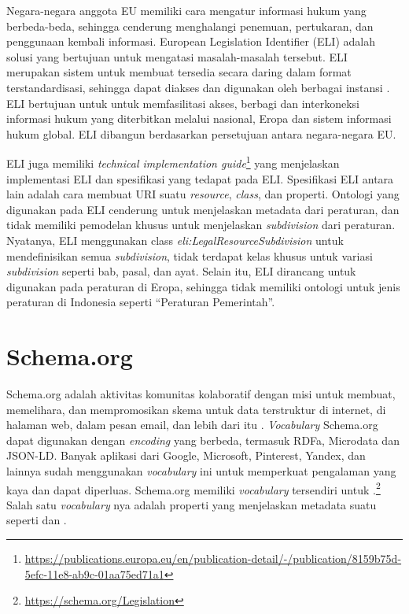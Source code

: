 Negara-negara anggota EU memiliki cara mengatur informasi hukum yang berbeda-beda, sehingga
cenderung menghalangi penemuan, pertukaran, dan penggunaan kembali informasi. European Legislation
Identifier (ELI) adalah solusi yang bertujuan untuk mengatasi masalah-masalah tersebut. ELI
merupakan sistem untuk membuat \legal tersedia secara daring dalam format terstandardisasi, sehingga
dapat diakses dan digunakan oleh berbagai instansi \citep{eli}. ELI bertujuan untuk untuk
memfasilitasi akses, berbagi dan interkoneksi informasi hukum yang diterbitkan melalui nasional,
Eropa dan sistem informasi hukum global. ELI dibangun berdasarkan persetujuan antara negara-negara
EU.

ELI juga memiliki \textit{technical implementation
  guide}\footnote{\url{https://publications.europa.eu/en/publication-detail/-/publication/8159b75d-5efc-11e8-ab9c-01aa75ed71a1}}
yang menjelaskan implementasi ELI dan spesifikasi yang tedapat pada ELI. Spesifikasi ELI antara lain
adalah cara membuat URI suatu \textit{resource}, \textit{class}, dan properti. Ontologi yang
digunakan pada ELI cenderung untuk menjelaskan metadata dari peraturan, dan tidak memiliki pemodelan
khusus untuk menjelaskan \textit{subdivision} dari peraturan. Nyatanya, ELI menggunakan class
\textit{eli:LegalResourceSubdivision} untuk mendefinisikan semua \textit{subdivision}, tidak
terdapat kelas khusus untuk variasi \textit{subdivision} seperti bab, pasal, dan ayat. Selain itu,
ELI dirancang untuk digunakan pada peraturan di Eropa, sehingga tidak memiliki ontologi untuk jenis
peraturan di Indonesia seperti ``Peraturan Pemerintah''.

\section{Schema.org}
\label{sec:schema-org}

Schema.org adalah aktivitas komunitas kolaboratif dengan misi untuk membuat, memelihara, dan
mempromosikan skema untuk data terstruktur di internet, di halaman web, dalam pesan email, dan lebih
dari itu \citep{schema.org}. \textit{Vocabulary} Schema.org dapat digunakan dengan \textit{encoding}
yang berbeda, termasuk RDFa, Microdata dan JSON-LD. Banyak aplikasi dari Google, Microsoft,
Pinterest, Yandex, dan lainnya sudah menggunakan \textit{vocabulary} ini untuk memperkuat pengalaman
yang kaya dan dapat diperluas. Schema.org memiliki \textit{vocabulary} tersendiri untuk
\legal.\footnote{\url{https://schema.org/Legislation}} Salah satu \textit{vocabulary} nya adalah
properti yang menjelaskan metadata suatu \legal seperti  dan
.

